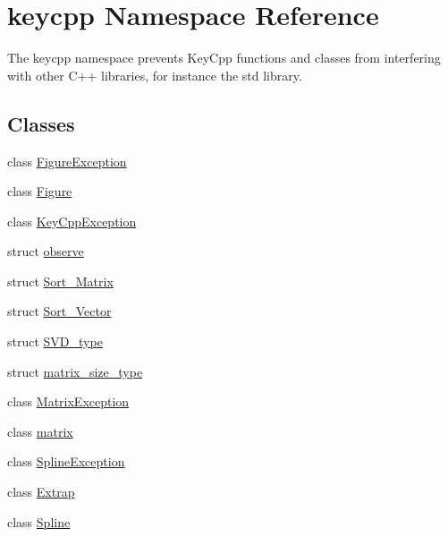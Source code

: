 \hypertarget{namespacekeycpp}{\section{keycpp Namespace Reference}
\label{namespacekeycpp}
}


The keycpp namespace prevents Key\-Cpp functions and classes from interfering with other C++ libraries, for instance the std library.  


\subsection*{Classes}
\begin{DoxyCompactItemize}
\item 
class \hyperlink{classkeycpp_1_1_figure_exception}{Figure\-Exception}
\item 
class \hyperlink{classkeycpp_1_1_figure}{Figure}
\item 
class \hyperlink{classkeycpp_1_1_key_cpp_exception}{Key\-Cpp\-Exception}
\item 
struct \hyperlink{structkeycpp_1_1observe}{observe}
\item 
struct \hyperlink{structkeycpp_1_1_sort___matrix}{Sort\-\_\-\-Matrix}
\item 
struct \hyperlink{structkeycpp_1_1_sort___vector}{Sort\-\_\-\-Vector}
\item 
struct \hyperlink{structkeycpp_1_1_s_v_d__type}{S\-V\-D\-\_\-type}
\item 
struct \hyperlink{structkeycpp_1_1matrix__size__type}{matrix\-\_\-size\-\_\-type}
\item 
class \hyperlink{classkeycpp_1_1_matrix_exception}{Matrix\-Exception}
\item 
class \hyperlink{classkeycpp_1_1matrix}{matrix}
\item 
class \hyperlink{classkeycpp_1_1_spline_exception}{Spline\-Exception}
\item 
class \hyperlink{classkeycpp_1_1_extrap}{Extrap}
\item 
class \hyperlink{classkeycpp_1_1_spline}{Spline}
\end{DoxyCompactItemize}
